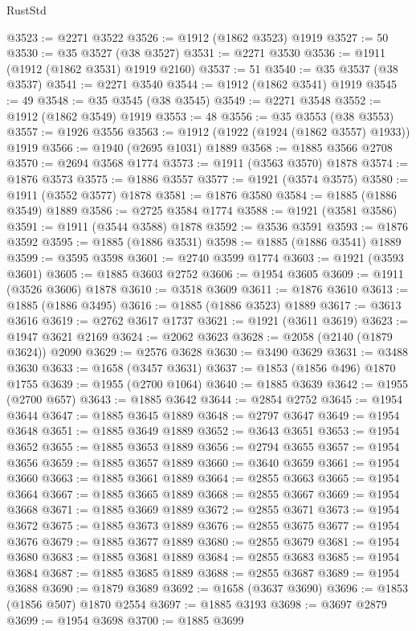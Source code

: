 \begin{lexlean}{RustStd}
\begin{coremodule}
@3523 := @2271 @3522
@3526 := @1912 (@1862 @3523) @1919
@3527 := 50
@3530 := @35 @3527 (@38 @3527)
@3531 := @2271 @3530
@3536 := @1911 (@1912 (@1862 @3531) @1919 @2160)
@3537 := 51
@3540 := @35 @3537 (@38 @3537)
@3541 := @2271 @3540
@3544 := @1912 (@1862 @3541) @1919
@3545 := 49
@3548 := @35 @3545 (@38 @3545)
@3549 := @2271 @3548
@3552 := @1912 (@1862 @3549) @1919
@3553 := 48
@3556 := @35 @3553 (@38 @3553)
@3557 := @1926 @3556
@3563 := @1912 (@1922 (@1924 (@1862 @3557) @1933)) @1919
@3566 := @1940 (@2695 @1031) @1889
@3568 := @1885 @3566 @2708
@3570 := @2694 @3568 @1774
@3573 := @1911 (@3563 @3570) @1878
@3574 := @1876 @3573
@3575 := @1886 @3557
@3577 := @1921 (@3574 @3575)
@3580 := @1911 (@3552 @3577) @1878
@3581 := @1876 @3580
@3584 := @1885 (@1886 @3549) @1889
@3586 := @2725 @3584 @1774
@3588 := @1921 (@3581 @3586)
@3591 := @1911 (@3544 @3588) @1878
@3592 := @3536 @3591
@3593 := @1876 @3592
@3595 := @1885 (@1886 @3531)
@3598 := @1885 (@1886 @3541) @1889
@3599 := @3595 @3598
@3601 := @2740 @3599 @1774
@3603 := @1921 (@3593 @3601)
@3605 := @1885 @3603 @2752
@3606 := @1954 @3605
@3609 := @1911 (@3526 @3606) @1878
@3610 := @3518 @3609
@3611 := @1876 @3610
@3613 := @1885 (@1886 @3495)
@3616 := @1885 (@1886 @3523) @1889
@3617 := @3613 @3616
@3619 := @2762 @3617 @1737
@3621 := @1921 (@3611 @3619)
@3623 := @1947 @3621 @2169
@3624 := @2062 @3623
@3628 := @2058 (@2140 (@1879 @3624)) @2090
@3629 := @2576 @3628
@3630 := @3490 @3629
@3631 := @3488 @3630
@3633 := @1658 (@3457 @3631)
@3637 := @1853 (@1856 @496) @1870 @1755
@3639 := @1955 (@2700 @1064)
@3640 := @1885 @3639
@3642 := @1955 (@2700 @657)
@3643 := @1885 @3642
@3644 := @2854 @2752
@3645 := @1954 @3644
@3647 := @1885 @3645 @1889
@3648 := @2797 @3647
@3649 := @1954 @3648
@3651 := @1885 @3649 @1889
@3652 := @3643 @3651
@3653 := @1954 @3652
@3655 := @1885 @3653 @1889
@3656 := @2794 @3655
@3657 := @1954 @3656
@3659 := @1885 @3657 @1889
@3660 := @3640 @3659
@3661 := @1954 @3660
@3663 := @1885 @3661 @1889
@3664 := @2855 @3663
@3665 := @1954 @3664
@3667 := @1885 @3665 @1889
@3668 := @2855 @3667
@3669 := @1954 @3668
@3671 := @1885 @3669 @1889
@3672 := @2855 @3671
@3673 := @1954 @3672
@3675 := @1885 @3673 @1889
@3676 := @2855 @3675
@3677 := @1954 @3676
@3679 := @1885 @3677 @1889
@3680 := @2855 @3679
@3681 := @1954 @3680
@3683 := @1885 @3681 @1889
@3684 := @2855 @3683
@3685 := @1954 @3684
@3687 := @1885 @3685 @1889
@3688 := @2855 @3687
@3689 := @1954 @3688
@3690 := @1879 @3689
@3692 := @1658 (@3637 @3690)
@3696 := @1853 (@1856 @507) @1870 @2554
@3697 := @1885 @3193
@3698 := @3697 @2879
@3699 := @1954 @3698
@3700 := @1885 @3699

\end{coremodule}
\end{lexlean}
